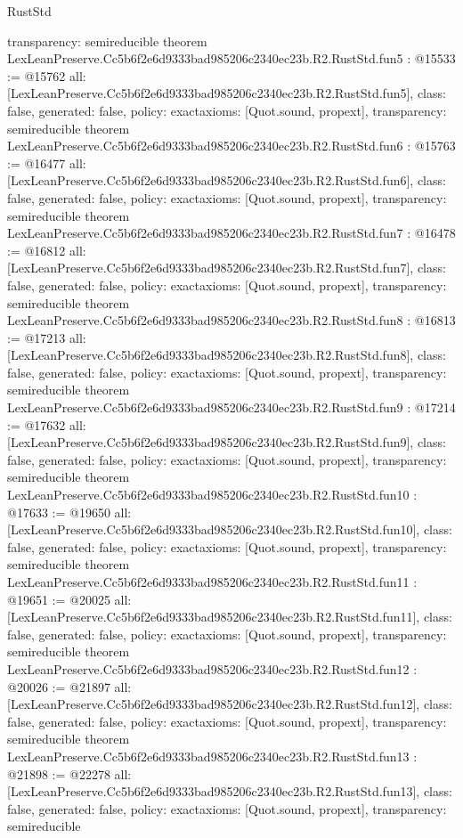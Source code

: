 \begin{lexlean}{RustStd}
\begin{coremodule}
{  transparency: semireducible
}
theorem LexLeanPreserve.Cc5b6f2e6d9333bad985206c2340ec23b.R2.RustStd.fun5 : @15533 := @15762 {
  all: [LexLeanPreserve.Cc5b6f2e6d9333bad985206c2340ec23b.R2.RustStd.fun5],
  class: false,
  generated: false,
  policy: exact{axioms: [Quot.sound, propext]},
  transparency: semireducible
}
theorem LexLeanPreserve.Cc5b6f2e6d9333bad985206c2340ec23b.R2.RustStd.fun6 : @15763 := @16477 {
  all: [LexLeanPreserve.Cc5b6f2e6d9333bad985206c2340ec23b.R2.RustStd.fun6],
  class: false,
  generated: false,
  policy: exact{axioms: [Quot.sound, propext]},
  transparency: semireducible
}
theorem LexLeanPreserve.Cc5b6f2e6d9333bad985206c2340ec23b.R2.RustStd.fun7 : @16478 := @16812 {
  all: [LexLeanPreserve.Cc5b6f2e6d9333bad985206c2340ec23b.R2.RustStd.fun7],
  class: false,
  generated: false,
  policy: exact{axioms: [Quot.sound, propext]},
  transparency: semireducible
}
theorem LexLeanPreserve.Cc5b6f2e6d9333bad985206c2340ec23b.R2.RustStd.fun8 : @16813 := @17213 {
  all: [LexLeanPreserve.Cc5b6f2e6d9333bad985206c2340ec23b.R2.RustStd.fun8],
  class: false,
  generated: false,
  policy: exact{axioms: [Quot.sound, propext]},
  transparency: semireducible
}
theorem LexLeanPreserve.Cc5b6f2e6d9333bad985206c2340ec23b.R2.RustStd.fun9 : @17214 := @17632 {
  all: [LexLeanPreserve.Cc5b6f2e6d9333bad985206c2340ec23b.R2.RustStd.fun9],
  class: false,
  generated: false,
  policy: exact{axioms: [Quot.sound, propext]},
  transparency: semireducible
}
theorem LexLeanPreserve.Cc5b6f2e6d9333bad985206c2340ec23b.R2.RustStd.fun10 : @17633 := @19650 {
  all: [LexLeanPreserve.Cc5b6f2e6d9333bad985206c2340ec23b.R2.RustStd.fun10],
  class: false,
  generated: false,
  policy: exact{axioms: [Quot.sound, propext]},
  transparency: semireducible
}
theorem LexLeanPreserve.Cc5b6f2e6d9333bad985206c2340ec23b.R2.RustStd.fun11 : @19651 := @20025 {
  all: [LexLeanPreserve.Cc5b6f2e6d9333bad985206c2340ec23b.R2.RustStd.fun11],
  class: false,
  generated: false,
  policy: exact{axioms: [Quot.sound, propext]},
  transparency: semireducible
}
theorem LexLeanPreserve.Cc5b6f2e6d9333bad985206c2340ec23b.R2.RustStd.fun12 : @20026 := @21897 {
  all: [LexLeanPreserve.Cc5b6f2e6d9333bad985206c2340ec23b.R2.RustStd.fun12],
  class: false,
  generated: false,
  policy: exact{axioms: [Quot.sound, propext]},
  transparency: semireducible
}
theorem LexLeanPreserve.Cc5b6f2e6d9333bad985206c2340ec23b.R2.RustStd.fun13 : @21898 := @22278 {
  all: [LexLeanPreserve.Cc5b6f2e6d9333bad985206c2340ec23b.R2.RustStd.fun13],
  class: false,
  generated: false,
  policy: exact{axioms: [Quot.sound, propext]},
  transparency: semireducible
}
\end{coremodule}
\end{lexlean}
